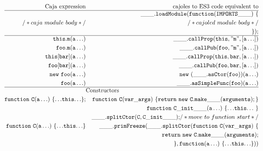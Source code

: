 \documentclass[letterpaper,twocolumn,10pt]{article}
\newcommand{\code}[1]{{\tt {#1}}}              %
\begin{document}
\begin{figure}
\begin{eqnarray}
  \mathrm{Caja\ expression} & \nonumber                & \mathrm{cajoles\ to\ ES3\ code\ equivalent\ to} \\ 
  \hline
                            & \label{module}           & \code{\_\_\_.loadModule(function(IMPORTS\_\_\_)\ \{} \\
  /*caja\ module\ body*/    & \nonumber                & \code{\ \ } /*cajoled\ module\ body*/ \\
                            & \nonumber                & \code{\});} \\
  \hline
  \code{this.m(a\ldots)}   & \label{call:internal}     & \code{\_\_\_.callProp(this,"m",[a\ldots])} \\
  \code{foo.m(a\ldots)}    & \label{call:public}       & \code{\_\_\_.callPub(foo,"m",[a\ldots])} \\
  \code{this[bar](a\ldots)} & \label{call:index-internal} & \code{\_\_\_.callProp(this,bar,[a\ldots])} \\
  \code{foo[bar](a\ldots)} & \label{call:index-public} & \code{\_\_\_.callPub(foo,bar,[a\ldots])} \\
  \code{new\ foo(a\ldots)} & \label{new:ctor}          & \code{new\ (\_\_\_.asCtor(foo))(a\ldots)} \\
  \code{foo(a\ldots)}      & \label{call:func}         & \code{\_\_\_.asSimpleFunc(foo)(a\ldots)} \\
  \hline
   \nonumber & \lefteqn{\mathrm{Constructors}} & \\
  \code{function\ C(a\ldots)\ \{{\ldots}this{\ldots}\};} 
             & \label{func:ctor-decl} & \code{function\ C(var\_args)\ \{ return\ new\ C.make\_\_\_(arguments); \}} \\
             & \nonumber              & \code{function\ C\_init\_\_\_(a\ldots)\ \{ {\ldots}this{\ldots}\ \}} \\
             & \nonumber              & \code{\_\_\_.splitCtor(C,C\_init\_\_\_);} /*move\ to\ function\ start*/ \\
  \code{function\ C(a\ldots)\ \{{\ldots}this{\ldots}\}}      
             & \label{func:ctor-expr} & \code{\_\_\_.primFreeze(\_\_\_.splitCtor(function\ C(var\_args)\ \{}\\
             & \nonumber              & \code{\ \ return\ new\ C.make\_\_\_(arguments);} \\
             & \nonumber              & \code{\}, function(a\ldots)\ \{{\ldots}this{\ldots}\}))} \\

\end{eqnarray}
\end{figure}
\end{document}
